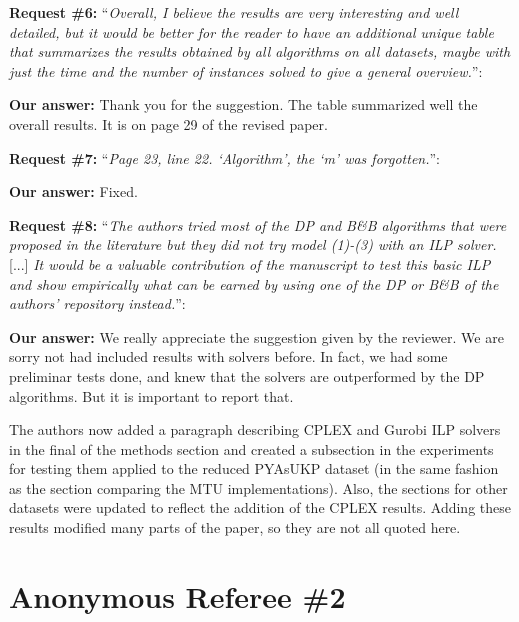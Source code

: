 \documentclass{elsarticle}
\begin{document}
\textbf{Request \#6:} ``\textit{Overall, I believe the results are very interesting and well detailed, but it would be better for the reader to have an additional unique table that summarizes the results obtained by all algorithms on all datasets, maybe with just the time and the number of instances solved to give a general overview.}'':

\textbf{Our answer:} Thank you for the suggestion. The table summarized well the overall results. It is on page 29 of the revised paper.
\bigskip

\textbf{Request \#7:} ``\textit{Page 23, line 22. `Algorithm', the `m' was forgotten.}'':

\textbf{Our answer:} Fixed.
\bigskip

\textbf{Request \#8:} ``\textit{The authors tried most of the DP and B\&B algorithms that were proposed in the literature but they did not try model (1)-(3) with an ILP solver.} [...] \textit{It would be a valuable contribution of the manuscript to test this basic ILP and show empirically what can be earned by using one of the DP or B\&B of the authors' repository instead.}'':

\textbf{Our answer:}
We really appreciate the suggestion given by the reviewer.
We are sorry not had included results with solvers before.
In fact, we had some preliminar tests done, and knew that the solvers are outperformed by the DP algorithms.
But it is important to report that.

The authors now added a paragraph describing CPLEX and Gurobi ILP solvers in the final of the methods section and created a subsection in the experiments for testing them applied to the reduced PYAsUKP dataset (in the same fashion as the section comparing the MTU implementations). Also, the sections for other datasets were updated to reflect the addition of the CPLEX results. Adding these results modified many parts of the paper, so they are not all quoted here.
\bigskip

\newpage
\section{Anonymous Referee \#2}
\end{document}
